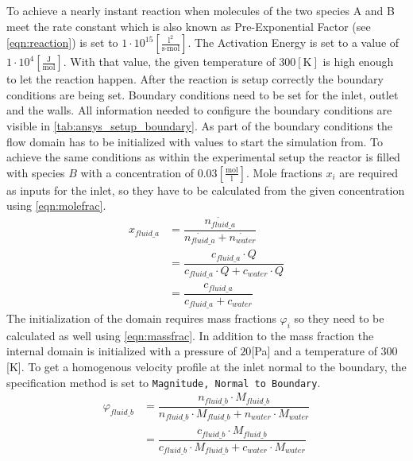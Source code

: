 \documentclass[../thesis.tex]{subfiles}
\begin{document}
To achieve a nearly instant reaction when molecules of the two species A and B meet the rate constant which is also known as Pre-Exponential Factor (see \autoref{eqn:reaction}) is set to $1 \cdot 10^{15} \left[ \frac{\text{l}^2}{\text{s} \cdot \text{mol}} \right]$. The Activation Energy is set to a value of $ 1 \cdot 10^{4} \left[\frac{\text{J}}{\text{mol}}\right]$. With that value, the given temperature of $300 [\text{K}]$ is high enough to let the reaction happen.
After the reaction is setup correctly the boundary conditions are being set. Boundary conditions need to be set for the inlet, outlet and the walls. All information needed to configure the boundary conditions are visible in \autoref{tab:ansys_setup_boundary}. As part of the boundary conditions the flow domain has to be initialized with values to start the simulation from. To achieve the same conditions as within the experimental setup the reactor is filled with species $B$ with a concentration of $0\text{.}03 \left[\frac{\text{mol}}{\text{l}}\right]$. Mole fractions $x_i$ are required as inputs for the inlet, so they have to be calculated from the given concentration using \autoref{eqn:molefrac}.
\begin{equation}
	\label{eqn:molefrac}
	\begin{split}
		x_{fluid\_a} & =\dfrac{\dot{n_{fluid\_a}}}{\dot{n_{fluid\_a}} + \dot{n_{water}}} \\[0.5em]
		& = \dfrac{c_{fluid\_a} \cdot Q}{c_{fluid\_a} \cdot Q + c_{water} \cdot Q} \\[0.5em]
		& = \dfrac{c_{fluid\_a}}{c_{fluid\_a} + c_{water}}
	\end{split}
\end{equation}
The initialization of the domain requires mass fractions $\varphi_i$ so they need to be calculated as well using \autoref{eqn:massfrac}. In addition to the mass fraction the internal domain is initialized with a pressure of $20$[Pa] and a temperature of $300$[K]. To get a homogenous velocity profile at the inlet normal to the boundary, the specification method is set to \texttt{Magnitude, Normal to Boundary}.
\begin{equation}
	\label{eqn:massfrac}
	\begin{split}
		\varphi_{fluid\_b} & = \dfrac{n_{fluid\_b} \cdot M_{fluid\_b}}{n_{fluid\_b} \cdot M_{fluid\_b} + n_{water} \cdot M_{water}} \\[1em]
		& = \dfrac{c_{fluid\_b} \cdot M_{fluid\_b}}{c_{fluid\_b} \cdot M_{fluid\_b} + c_{water} \cdot M_{water}} \\
	\end{split}
\end{equation}
\end{document}

